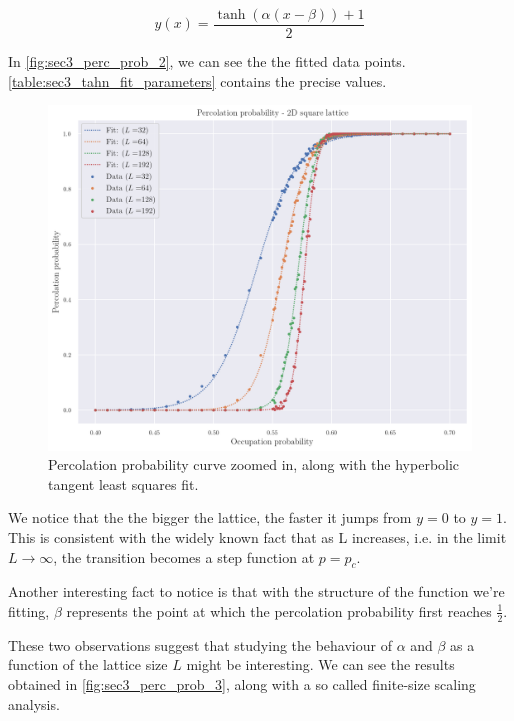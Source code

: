 $$ 
y(x) = \frac{\tanh(\alpha(x - \beta)) + 1}{2}
$$ 

In \autoref{fig:sec3_perc_prob_2}, we can see the the fitted data points. \autoref{table:sec3_tahn_fit_parameters} contains the precise values.


\begin{figure}[H]
  \includegraphics[width=\linewidth]{Images/sec3_perc_prob_2.png}
  \caption{Percolation probability curve zoomed in, along with the hyperbolic tangent least squares fit.}
  \label{fig:sec3_perc_prob_2}
\end{figure}

We notice that the the bigger the lattice, the faster it jumps from $y=0$ to $y=1$. This is consistent with the widely known fact that as L increases, i.e. in the limit $L \rightarrow \infty $, the transition becomes a step function at $p = p_c$. 

Another interesting fact to notice is that with the structure of the function we're fitting, $\beta$ represents the point at which the percolation probability first reaches $\frac{1}{2}$.

These two observations suggest that studying the behaviour of $\alpha$ and $\beta$ as a function of the lattice size $L$ might be interesting. We can see the results obtained in \autoref{fig:sec3_perc_prob_3}, along with a so called finite-size scaling analysis.

